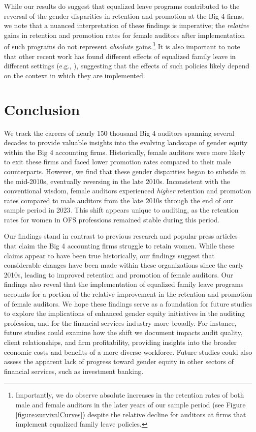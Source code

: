 \documentclass[11pt]{article}
\begin{document}
            While our results do suggest that equalized leave programs contributed to the reversal of the gender disparities in retention and promotion at the Big 4 firms, we note that a nuanced interpretation of these findings is imperative; the \textit{relative} gains in retention and promotion rates for female auditors after implementation of such programs do not represent \textit{absolute} gains.\footnote{Importantly, we do observe absolute increases in the retention rates of both male and female auditors in the later years of our sample period (see Figure \ref{figure:survivalCurves}) despite the relative decline for auditors at firms that implement equalized family leave policies.} It is also important to note that other recent work has found different effects of equalized family leave in different settings (e.g., \cite{antecolEqualInequitableWho2018}), suggesting that the effects of such policies likely depend on the context in which they are implemented.
            
\section{Conclusion} \label{section:conclusion}
    We track the careers of nearly 150 thousand Big 4 auditors spanning several decades to provide valuable insights into the evolving landscape of gender equity within the Big 4 accounting firms. Historically, female auditors were more likely to exit these firms and faced lower promotion rates compared to their male counterparts. However, we find that these gender disparities began to subside in the mid-2010s, eventually reversing in the late 2010s. Inconsistent with the conventional wisdom, female auditors experienced \textit{higher} retention and promotion rates compared to male auditors from the late 2010s through the end of our sample period in 2023. This shift appears unique to auditing, as the retention rates for women in OFS professions remained stable during this period. 
    
    Our findings stand in contrast to previous research and popular press articles that claim the Big 4 accounting firms struggle to retain women. While these claims appear to have been true historically, our findings suggest that considerable changes have been made within these organizations since the early 2010s, leading to improved retention and promotion of female auditors. Our findings also reveal that the implementation of equalized family leave programs accounts for a portion of the relative improvement in the retention and promotion of female auditors. We hope these findings serve as a foundation for future studies to explore the implications of enhanced gender equity initiatives in the auditing profession, and for the financial services industry more broadly. For instance, future studies could examine how the shift we document impacts audit quality, client relationships, and firm profitability, providing insights into the broader economic costs and benefits of a more diverse workforce. Future studies could also assess the apparent lack of progress toward gender equity in other sectors of financial services, such as investment banking.
\end{document}
